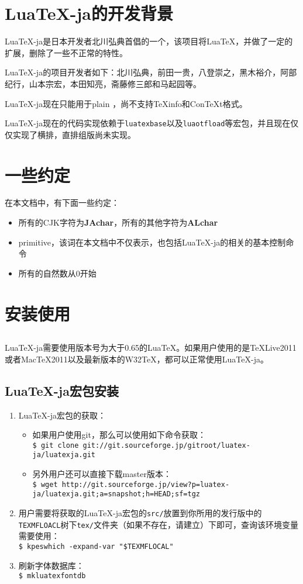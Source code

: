 \documentclass{ltjarticle}
\def\LuaTeX{Lua\TeX}
\def\pTeX{p\TeX}
\begin{document}
\section{\LuaTeX-ja的开发背景}
\LuaTeX-ja是日本开发者北川弘典首倡的一个，该项目将\LuaTeX，并做了一定的扩展，删除了一些不正常的特性。

\LuaTeX-ja的项目开发者如下：北川弘典，前田一贵，八登崇之，黑木裕介，阿部纪行，山本宗宏，本田知亮，斋藤修三郎和马起园等。

\LuaTeX-ja现在只能用于plain ，尚不支持\TeX info和Con\TeX t格式。

\LuaTeX-ja现在的代码实现依赖于\verb!luatexbase!以及\verb!luaotfload!等宏包，并且现在仅仅实现了横排，直排组版尚未实现。
\section{一些约定}
在本文档中，有下面一些约定：
\begin{itemize}
\item 所有的CJK字符为\textbf{JAchar}，所有的其他字符为\textbf{ALchar}
\item primitive，该词在本文档中不仅表示，也包括\LuaTeX-ja的相关的基本控制命令
\item 所有的自然数从0开始
\end{itemize}
\section{安装使用}
\subsection{}
\LuaTeX-ja需要使用版本号为大于0.65的\LuaTeX。如果用户使用的是\TeX Live2011或者Mac\TeX 2011以及最新版本的W32\TeX，都可以正常使用\LuaTeX-ja。
\subsection{\LuaTeX-ja宏包安装}
\begin{enumerate}
\item \LuaTeX-ja宏包的获取：
	\begin{itemize}
	\item 如果用户使用git，那么可以使用如下命令获取：\\
		\verb!$ git clone git://git.sourceforge.jp/gitroot/luatex-ja/luatexja.git!
	\item 另外用户还可以直接下载master版本：\\
		\verb!$ wget http://git.sourceforge.jp/view?p=luatex-ja/luatexja.git;a=snapshot;h=HEAD;sf=tgz!
	\end{itemize}
\item 用户需要将获取的\LuaTeX-ja宏包的\verb!src/!放置到你所用的发行版中的\verb!TEXMFLOACL!树下\verb!tex/!文件夹（如果不存在，请建立）下即可，查询该环境变量需要使用：\\
	\verb!$ kpeswhich -expand-var "$TEXMFLOCAL"!
\item 刷新字体数据库：\\
	\verb!$ mkluatexfontdb!
\end{enumerate}
\end{document}
